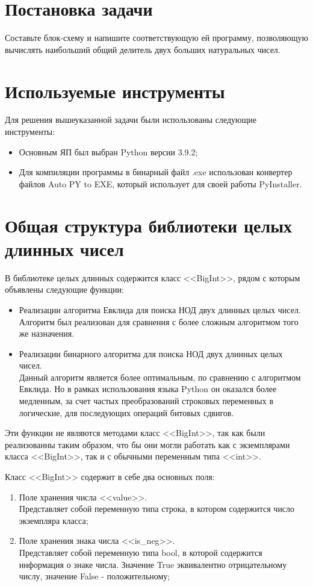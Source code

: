 \section{Постановка задачи}
Составьте блок-схему и напишите соответствующую ей программу, позволяющую
вычислять наибольший общий делитель двух больших натуральных чисел.


\clearpage
\section{Используемые инструменты}
Для решения вышеуказанной задачи были использованы следующие инструменты:
\begin{itemize}
    \item Основным ЯП был выбран Python версии 3.9.2;
    \item Для компиляции программы в бинарный файл .exe использован конвертер файлов Auto PY to EXE,
    который использует для своей работы PyInstaller.
\end{itemize}


\clearpage
\section{Общая структура библиотеки целых\\длинных чисел}
В библиотеке целых длинных содержится класс <<BigInt>>, рядом с которым объявлены следующие функции:
\begin{itemize}
    \item Реализации алгоритма Евклида для поиска НОД двух длинных целых чисел.\\
    Алгоритм был реализован для сравнения с более сложным алгоритмом того же назначения.
    \item Реализации бинарного алгоритма для поиска НОД двух длинных целых чисел.\\
    Данный алгоритм является более оптимальным, по сравнению с алгоритмом Евклида.
    Но в рамках использования языка Python он оказался более медленным, за счет частых преобразований
    строковых переменных в логические, для последующих операций битовых сдвигов.
\end{itemize}
Эти функции не являются методами класс <<BigInt>>, так как были реализованны таким образом,
что бы они могли работать как с экземплярами класса <<BigInt>>, так и с обычными переменным типа <<int>>.

Класс <<BigInt>> содержит в себе два основных поля:
\begin{enumerate}
    \item Поле хранения числа <<value>>.\\
    Представляет собой переменную типа строка, в котором содержится число экземпляра класса;
    \item Поле хранения знака числа <<is\_neg>>.\\
    Представляет собой переменную типа bool, в которой содержится информация о знаке числа.
    Значение True эквивалентно отрицательному числу, значение False - положительному;
\end{enumerate}

